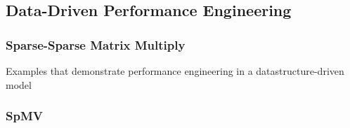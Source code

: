 \documentclass{article}
\begin{document}
\subsection{Data-Driven Performance Engineering}
\subsubsection{Sparse-Sparse Matrix Multiply}
Examples that demonstrate performance engineering in a datastructure-driven model

\subsubsection{SpMV}

\end{document}

